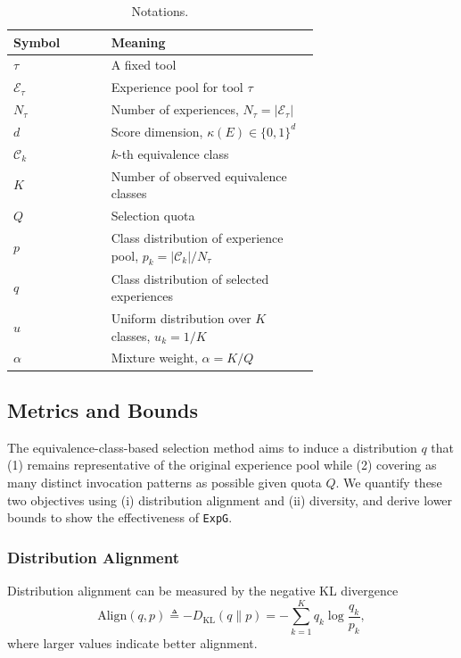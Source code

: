 \documentclass[11pt]{article}
\newcommand{\ours}{\texttt{ExpG}}
\begin{document}
\begin{table}[t]
\caption{Notations.}
\centering
\small
\begin{tabular}{@{}lp{0.68\linewidth}@{}}
\toprule
Symbol & Meaning \\
\midrule
$\tau$ & A fixed tool \\
$\mathcal{E}_\tau$ & Experience pool for tool $\tau$ \\
$N_\tau$ & Number of experiences, $N_\tau=|\mathcal{E}_\tau|$ \\
$d$ & Score dimension, $\kappa(E)\in\{0,1\}^d$ \\
$\mathcal{C}_k$ & $k$-th equivalence class \\
$K$ & Number of observed equivalence classes \\
$Q$ & Selection quota \\
$p$ & Class distribution of experience pool, $p_k=|\mathcal{C}_k|/N_\tau$ \\
$q$ & Class distribution of selected experiences\\
$u$ & Uniform distribution over $K$ classes, $u_k=1/K$ \\
$\alpha$ & Mixture weight, $\alpha=K/Q$ \\
\bottomrule
\end{tabular}

\label{tab:ecs_notation}
\end{table}

\subsection{Metrics and Bounds}
The equivalence-class-based selection method aims to induce a distribution $q$ that (1) remains representative of the
original experience pool while (2) covering as many distinct invocation patterns as possible given quota $Q$.
We quantify these two objectives using (i) distribution alignment and (ii) diversity, and derive lower bounds to show the effectiveness of {\ours}.

\subsubsection{Distribution Alignment}
Distribution alignment can be measured by the negative KL divergence~\cite{kl}
\begin{equation}
\text{Align}(q,p)\triangleq -D_{\mathrm{KL}}(q\|p)
= -\sum_{k=1}^{K} q_k \log\frac{q_k}{p_k},
\end{equation}
where larger values indicate better alignment. 
\end{document}
